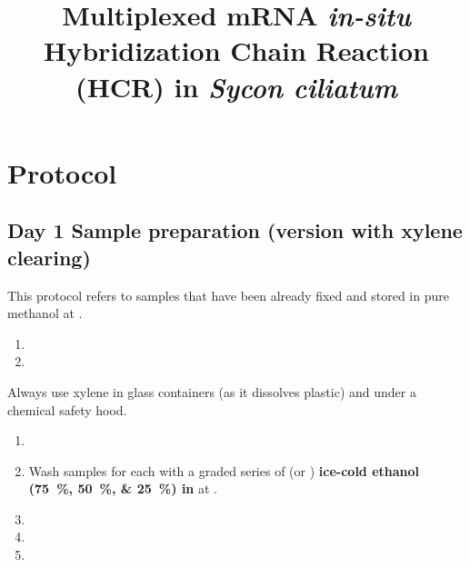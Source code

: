 \documentclass[12pt]{report}
\begin{document}

\title{\vspace{-3em} Multiplexed mRNA \textit{in-situ} Hybridization Chain Reaction (HCR) in \emph{Sycon ciliatum}}
\maketitle
\thispagestyle{plain}

\section*{\vspace{-1em} \textendash{} Protocol \textendash{}}

\subsection*{Day 1 \textendash{} Sample preparation (version with xylene clearing)}

\alert{This protocol refers to samples that have been already fixed and stored in pure methanol at \minustwenty.}

\begin{enumerate}[series = steps]
	\item {}
	\item {}
\end{enumerate}

\bigskip\alert{Always use xylene in glass containers (as it dissolves plastic) and under a chemical safety hood.}

\begin{enumerate}[resume = steps]
	\item {}
	\item Wash samples for \underline{\quarter} each with a graded series of \fivehunmicrol{} (or \onemil) \textbf{ice-cold ethanol (\qtylist{75;50;25}{\percent}) in \hs{}} at \fourdegree.
	\item {}
	\item {}
	\item {}
\end{enumerate}
\end{document}
